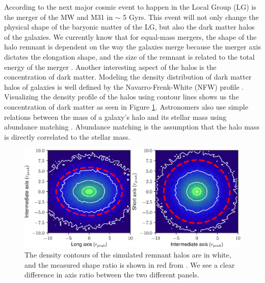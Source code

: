 \documentclass[linenumbers, twocolumn]{aastex631}
\begin{document}
According to \cite{2012VanDerMarel} the next major cosmic event to happen in the Local Group (LG) is the merger of the MW and M31 in $\sim$ 5 Gyrs. 
This event will not only change the physical shape of the baryonic matter of the LG, but also the dark matter halos of the galaxies.
We currently know that for equal-mass mergers, the shape of the halo remnant is dependent on the way the galaxies merge because the merger axis dictates the elongation shape, and the size of the remnant is related to the total energy of the merger \citep{2019drakos}. 
Another interesting aspect of the halos is the concentration of dark matter.
Modeling the density distribution of dark matter halos of galaxies is well defined by the Navarro-Frenk-White (NFW) profile \citep{1996NFW}. Visualizing the density profile of the halos using contour lines shows us the concentration of dark matter as seen in Figure \ref{fig:drakos}.
Astronomers also use simple relations between the mass of a galaxy's halo and its stellar mass using abundance matching \citep{2018Wechsler}. Abundance matching is the assumption that the halo mass is directly correlated to the stellar mass.
\begin{figure}[ht]
    \centering
    \includegraphics[scale=0.5]{drakos_fig_6.png}
    \caption{The density contours of the simulated remnant halos are in white, and the measured shape ratio is shown in red from \cite{2019drakos}. We see a clear difference in axis ratio between the two different panels.}
    \label{fig:drakos}
\end{figure}
\end{document}
